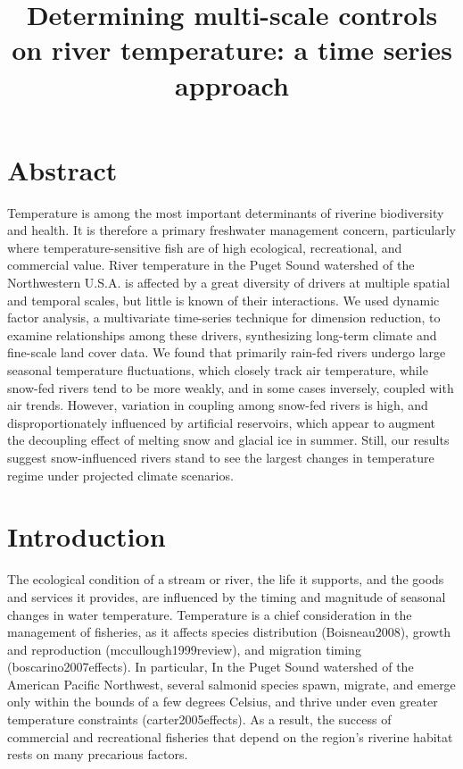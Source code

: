 \title{Determining multi-scale controls on river temperature: a time series approach}

\section*{Abstract}
Temperature is among the most important determinants of riverine biodiversity and health. It is therefore a primary freshwater management concern, particularly where temperature-sensitive fish are of high ecological, recreational, and commercial value. River temperature in the Puget Sound watershed of the Northwestern U.S.A. is affected by a great diversity of drivers at multiple spatial and temporal scales, but little is known of their interactions. We used dynamic factor analysis, a multivariate time-series technique for dimension reduction, to examine relationships among these drivers, synthesizing long-term climate and fine-scale land cover data. We found that primarily rain-fed rivers undergo large seasonal temperature fluctuations, which closely track air temperature, while snow-fed rivers tend to be more weakly, and in some cases inversely, coupled with air trends. However, variation in coupling among snow-fed rivers is high, and disproportionately influenced by artificial reservoirs, which appear to augment the decoupling effect of melting snow and glacial ice in summer. Still, our results suggest snow-influenced rivers stand to see the largest changes in temperature regime under projected climate scenarios.

\section*{Introduction}

The ecological condition of a stream or river, the life it supports, and the goods and services it provides, are influenced by the timing and magnitude of seasonal changes in water temperature. Temperature is a chief consideration in the management of fisheries, as it affects species distribution (Boisneau2008), growth and reproduction (mccullough1999review), and migration timing (boscarino2007effects). In particular, In the Puget Sound watershed of the American Pacific Northwest, several salmonid species spawn, migrate, and emerge only within the bounds of a few degrees Celsius, and thrive under even greater temperature constraints (carter2005effects). As a result, the success of commercial and recreational fisheries that depend on the region's riverine habitat rests on many precarious factors.

